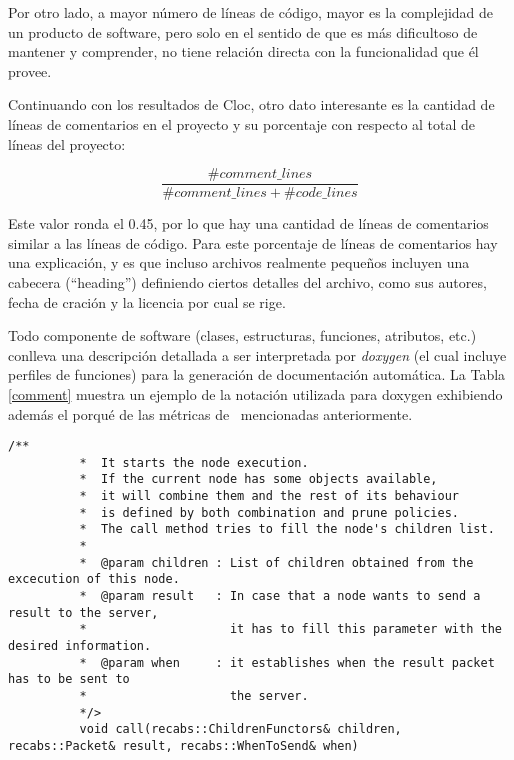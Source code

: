     Por otro lado, a mayor n\'umero de l\'ineas de c\'odigo, mayor es la complejidad de un producto de software, pero solo en el sentido de que 
    es m\'as dificultoso de mantener y comprender, no tiene relaci\'on directa con la funcionalidad que \'el provee.

    Continuando con los resultados de Cloc, otro dato interesante es la cantidad de l\'ineas de comentarios en el proyecto y su porcentaje con
    respecto al total de l\'ineas del proyecto:

    $$\frac{\#comment\_lines}{\#comment\_lines + \#code\_lines}$$

    Este valor ronda el 0.45, por lo que hay una cantidad de l\'ineas de comentarios similar a las l\'ineas de c\'odigo.
    Para este porcentaje de l\'ineas de comentarios hay una explicaci\'on, y es que incluso archivos realmente peque\~nos incluyen una
    cabecera (``heading'') definiendo ciertos detalles del archivo, como sus autores, fecha de craci\'on y la licencia por cual se rige.

    Todo componente de software (clases, estructuras, funciones, atributos, etc.) conlleva una descripci\'on detallada a ser interpretada por
    \textit{doxygen} (el cual incluye perfiles de funciones) para la generaci\'on de documentaci\'on autom\'atica. La Tabla \ref{comment} muestra un
    ejemplo de la notaci\'on utilizada para doxygen exhibiendo adem\'as el porqu\'e de las m\'etricas de \combeng \ mencionadas anteriormente.

      \begin{table}[!htb]
        \lstset{language=C++}
        \begin{lstlisting}[frame=single]
          /**
          *  It starts the node execution. 
          *  If the current node has some objects available,
          *  it will combine them and the rest of its behaviour
          *  is defined by both combination and prune policies.
          *  The call method tries to fill the node's children list.
          *
          *  @param children : List of children obtained from the excecution of this node.
          *  @param result   : In case that a node wants to send a result to the server,
          *                    it has to fill this parameter with the desired information.
          *  @param when     : it establishes when the result packet has to be sent to 
          *                    the server.
          */>
          void call(recabs::ChildrenFunctors& children, recabs::Packet& result, recabs::WhenToSend& when)
        \end{lstlisting}
        \centering \caption{Comentario de una funci\'on}\label{comment}
      \end{table}

